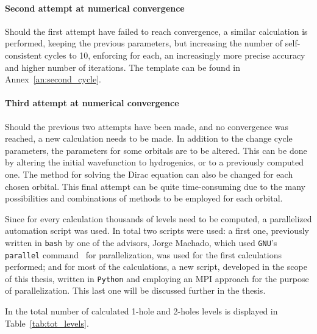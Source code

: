 \paragraph{Second attempt at numerical convergence}
Should the first attempt have failed to reach convergence, a similar calculation is performed, keeping the previous parameters, but increasing the number of self-consistent cycles to 10, enforcing for each, an increasingly more precise accuracy and higher number of iterations. The template can be found in Annex~\ref{an:second_cycle}.


\paragraph{Third attempt at numerical convergence}
Should the previous two attempts have been made, and no convergence was reached, a new calculation needs to be made. In addition to the change cycle parameters, the parameters for some orbitals are to be altered. This can be done by altering the initial wavefunction to hydrogenics, or to a previously computed one. The method for solving the Dirac equation can also be changed for each chosen orbital. This final attempt can be quite time-consuming due to the many possibilities and combinations of methods to be employed for each orbital.


Since for every calculation thousands of levels need to be computed, a parallelized automation script was used. In total two scripts were used: a first one, previously written in \verb|bash| by one of the advisors, Jorge Machado, which used \verb|GNU|'s \verb|parallel|  command~\cite{Tange2011a} for parallelization, was used for the first calculations performed; and for most of the calculations, a new script, developed in the scope of this thesis, written in \verb|Python| and employing an \gls{MPI} approach for the purpose of parallelization. This last one will be discussed further in the thesis.

In the total number of calculated 1-hole and 2-holes levels is displayed in Table~\ref{tab:tot_levels}.

